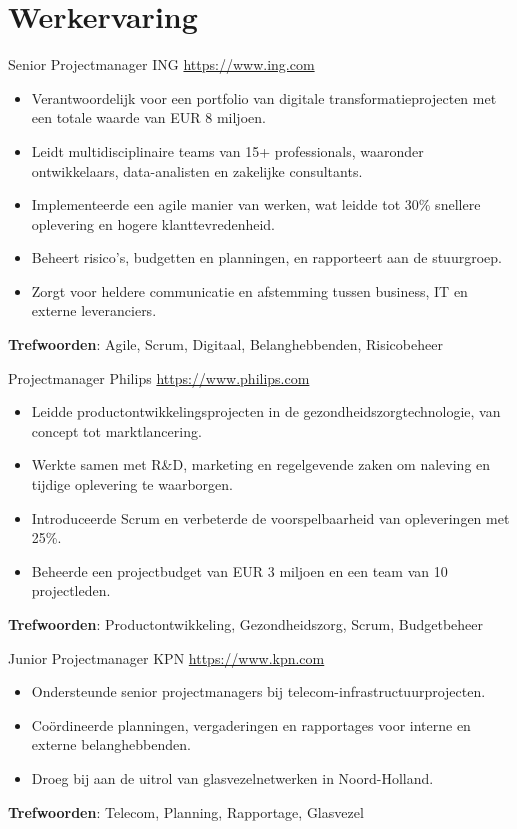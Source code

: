 \documentclass[a4paper, serif, 10pt]{moderncv}
\begin{document}
\section{Werkervaring}

        {Senior Projectmanager}
        {ING}
        {\url{https://www.ing.com}}
        {}
        {\begin{itemize}
\item Verantwoordelijk voor een portfolio van digitale transformatieprojecten met een totale waarde van EUR 8 miljoen.
\item Leidt multidisciplinaire teams van 15+ professionals, waaronder ontwikkelaars, data-analisten en zakelijke consultants.
\item Implementeerde een agile manier van werken, wat leidde tot 30\% snellere oplevering en hogere klanttevredenheid.
\item Beheert risico's, budgetten en planningen, en rapporteert aan de stuurgroep.
\item Zorgt voor heldere communicatie en afstemming tussen business, IT en externe leveranciers.
\end{itemize}
\textbf{Trefwoorden}: Agile, Scrum, Digitaal, Belanghebbenden, Risicobeheer}

        {Projectmanager}
        {Philips}
        {\url{https://www.philips.com}}
        {}
        {\begin{itemize}
\item Leidde productontwikkelingsprojecten in de gezondheidszorgtechnologie, van concept tot marktlancering.
\item Werkte samen met R\&D, marketing en regelgevende zaken om naleving en tijdige oplevering te waarborgen.
\item Introduceerde Scrum en verbeterde de voorspelbaarheid van opleveringen met 25\%.
\item Beheerde een projectbudget van EUR 3 miljoen en een team van 10 projectleden.
\end{itemize}
\textbf{Trefwoorden}: Productontwikkeling, Gezondheidszorg, Scrum, Budgetbeheer}

        {Junior Projectmanager}
        {KPN}
        {\url{https://www.kpn.com}}
        {}
        {\begin{itemize}
\item Ondersteunde senior projectmanagers bij telecom-infrastructuurprojecten.
\item Coördineerde planningen, vergaderingen en rapportages voor interne en externe belanghebbenden.
\item Droeg bij aan de uitrol van glasvezelnetwerken in Noord-Holland.
\end{itemize}
\textbf{Trefwoorden}: Telecom, Planning, Rapportage, Glasvezel}
\end{document}
